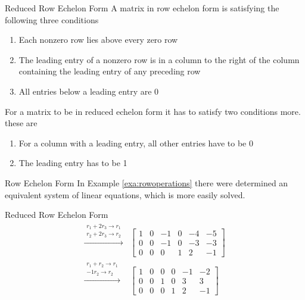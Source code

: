 \begin{definition}{Reduced Row Echelon Form}
A matrix in row echelon form is satisfying the following three conditions
\begin{enumerate}
    \item Each nonzero row lies above every zero row
    \item The leading entry of a nonzero row is in a column to the right of the column containing the leading entry of any preceding row
    \item All entries below a leading entry are $0$
\end{enumerate}
For a matrix to be in reduced echelon form it has to satisfy two conditions more. these are
\begin{enumerate}
    \item For a column with a leading entry, all other entries have to be 0
    \item The leading entry has to be 1
\end{enumerate}
\end{definition}

\begin{example}{Row Echelon Form}
    In Example \autoref{exa:rowoperations} there were determined an equivalent system of linear equations, which is more easily solved. 
\end{example}

\begin{example}{Reduced Row Echelon Form}
\begin{align*}
  \xrightarrow{\substack{r_1+2r_3\rightarrow r_1\\r_2+2r_3\rightarrow r_2}}
    &\begin{bmatrix}
  	    1 & 0 & -1 &0 & -4 & -5 \\
 	    0 & 0 & -1 & 0 & -3 & -3 \\
	    0 &0 & 0 & 1 & 2 & -1
     \end{bmatrix}\\
  \xrightarrow{\substack{r_1+r_2\rightarrow r_1\\-1r_2\rightarrow r_2}}
  &\begin{bmatrix}
        1 & 0 & 0 &0 & -1 & -2 \\
 	    0 & 0 & 1 & 0 & 3 & 3 \\
	    0 &0 & 0 & 1 & 2 & -1
     \end{bmatrix}
\end{align*}
\end{example}

